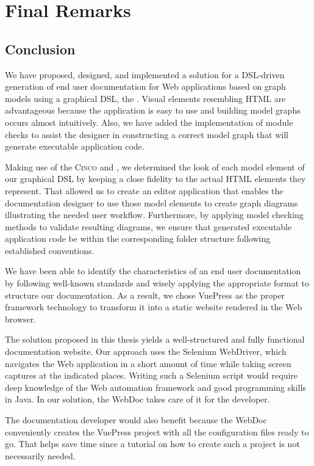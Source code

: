 \chapter{Final Remarks}\label{ch:epilogue}

\section{Conclusion}\label{sec:concl}

We have proposed, designed, and implemented a solution for a DSL-driven generation of end user documentation for Web applications based on graph models using a graphical DSL, the \@. Visual elements resembling HTML are advantageous because the application is easy to use and building model graphs occurs almost intuitively. Also, we have added the implementation of module checks to assist the designer in constructing a correct model graph that will generate executable application code.

Making use of the \textsc{Cinco}  and , we determined the look of each model element of our graphical DSL by keeping a close fidelity to the actual HTML elements they represent. That allowed us to create an editor application that enables the documentation designer to use those model elements to create graph diagrams illustrating the needed user workflow. Furthermore, by applying model checking methods to validate resulting diagrams, we ensure that generated executable application code be within the corresponding folder structure following established conventions.

We have been able to identify the characteristics of an end user documentation by following well-known standards and wisely applying the appropriate format to structure our documentation. As a result, we chose VuePress as the proper framework technology to transform it into a static website rendered in the Web browser.

The solution proposed in this thesis yields a well-structured and fully functional documentation website. Our approach uses the Selenium WebDriver, which navigates the Web application in a short amount of time while taking screen captures at the indicated places. Writing such a Selenium script would require deep knowledge of the Web automation framework and good programming skills in Java. In our solution, the WebDoc takes care of it for the developer.

The documentation developer would also benefit because the WebDoc conveniently creates the VuePress project with all the configuration files ready to go. That helps save time since a tutorial on how to create such a project is not necessarily needed.

